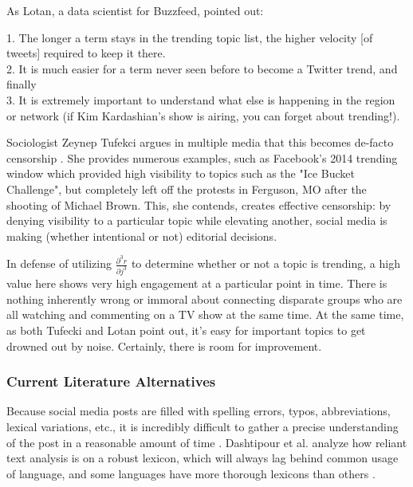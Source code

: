 \documentclass[preprint,review,12pt]{elsarticle}
\begin{document}
As Lotan, a data scientist for Buzzfeed, pointed out:
\begin{displayquote}
1. The longer a term stays in the trending topic list, the higher velocity [of tweets] required to keep it there. \\
2. It is much easier for a term never seen before to become a Twitter trend, and finally \\
3. It is extremely important to understand what else is happening in the region or network (if Kim Kardashian’s show is airing, you can forget about trending!). \cite{lotan2015freddie}
\end{displayquote}

Sociologist Zeynep Tufekci argues in multiple media that this becomes de-facto censorship \cite{tufekci2017twitter,tufecki2018democracy,tufekci2017we,tufekci2014online}. She provides numerous examples, such as Facebook's 2014 trending window which provided high visibility to topics such as the "Ice Bucket Challenge", but completely left off the protests in Ferguson, MO after the shooting of Michael Brown. This, she contends, creates effective censorship: by denying visibility to a particular topic while elevating another, social media is making (whether intentional or not) editorial decisions. 

In defense of utilizing $\frac{\partial^3 r}{\partial j^3}$ to determine whether or not a topic is trending, a high value here shows very high engagement at a particular point in time. There is nothing inherently wrong or immoral about connecting disparate groups who are all watching and commenting on a TV show at the same time. At the same time, as both Tufecki and Lotan point out, it's easy for important topics to get drowned out by noise. Certainly, there is room for improvement.

\subsubsection{Current Literature Alternatives} 
Because social media posts are filled with spelling errors, typos, abbreviations, lexical variations, etc., it is incredibly difficult to gather a precise understanding of the post in a reasonable amount of time \cite{vandam2019learning,laniado2010making,schubert2014signitrend}. Dashtipour et al. analyze how reliant text analysis is on a robust lexicon, which will always lag behind common usage of language, and some languages have more thorough lexicons than others \cite{dashtipour2016multilingual}.
\end{document}
